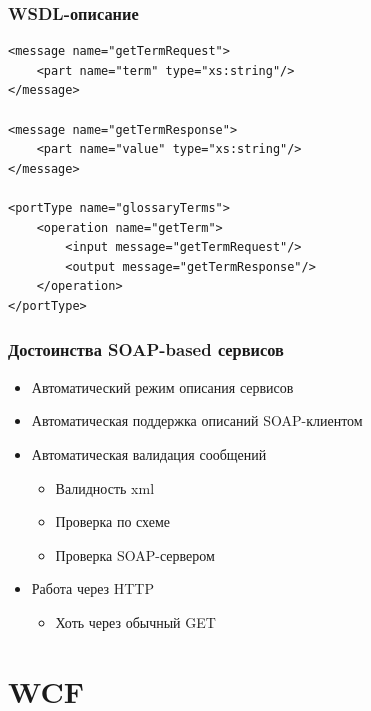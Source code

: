 \documentclass[xetex,mathserif,serif]{beamer}
\begin{document}
    \begin{frame}[fragile]
        \frametitle{WSDL-описание}
        \begin{small}
            \begin{verbatim}
<message name="getTermRequest">
    <part name="term" type="xs:string"/>
</message>

<message name="getTermResponse">
    <part name="value" type="xs:string"/>
</message>

<portType name="glossaryTerms">
    <operation name="getTerm">
        <input message="getTermRequest"/>
        <output message="getTermResponse"/>
    </operation>
</portType>
            \end{verbatim}
        \end{small}
    \end{frame}

    \begin{frame}
        \frametitle{Достоинства SOAP-based сервисов}
        \begin{itemize}
            \item Автоматический режим описания сервисов
            \item Автоматическая поддержка описаний SOAP-клиентом
            \item Автоматическая валидация сообщений
            \begin{itemize}
                \item Валидность xml
                \item Проверка по схеме
                \item Проверка SOAP-сервером
            \end{itemize}
            \item Работа через HTTP
            \begin{itemize}
                \item Хоть через обычный GET
            \end{itemize}
        \end{itemize}
    \end{frame}

    \section{WCF}
\end{document}
